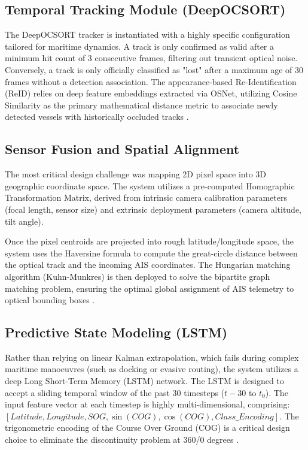 \subsection{Temporal Tracking Module (DeepOCSORT)}
The DeepOCSORT tracker is instantiated with a highly specific configuration tailored for maritime dynamics. A track is only confirmed as valid after a minimum hit count of 3 consecutive frames, filtering out transient optical noise. Conversely, a track is only officially classified as "lost" after a maximum age of 30 frames without a detection association. The appearance-based Re-Identification (ReID) relies on deep feature embeddings extracted via OSNet, utilizing Cosine Similarity as the primary mathematical distance metric to associate newly detected vessels with historically occluded tracks \citep{Ref07}.

\subsection{Sensor Fusion and Spatial Alignment}
The most critical design challenge was mapping 2D pixel space into 3D geographic coordinate space. The system utilizes a pre-computed Homographic Transformation Matrix, derived from intrinsic camera calibration parameters (focal length, sensor size) and extrinsic deployment parameters (camera altitude, tilt angle). 

Once the pixel centroids are projected into rough latitude/longitude space, the system uses the Haversine formula to compute the great-circle distance between the optical track and the incoming AIS coordinates. The Hungarian matching algorithm (Kuhn-Munkres) is then deployed to solve the bipartite graph matching problem, ensuring the optimal global assignment of AIS telemetry to optical bounding boxes \citep{Ref08}. 

\subsection{Predictive State Modeling (LSTM)}
Rather than relying on linear Kalman extrapolation, which fails during complex maritime manoeuvres (such as docking or evasive routing), the system utilizes a deep Long Short-Term Memory (LSTM) network. The LSTM is designed to accept a sliding temporal window of the past 30 timesteps ($t-30$ to $t_{0}$). The input feature vector at each timestep is highly multi-dimensional, comprising: $[Latitude, Longitude, SOG, \sin(COG), \cos(COG), Class\_Encoding]$. The trigonometric encoding of the Course Over Ground (COG) is a critical design choice to eliminate the discontinuity problem at 360/0 degrees \citep{Ref09}.

